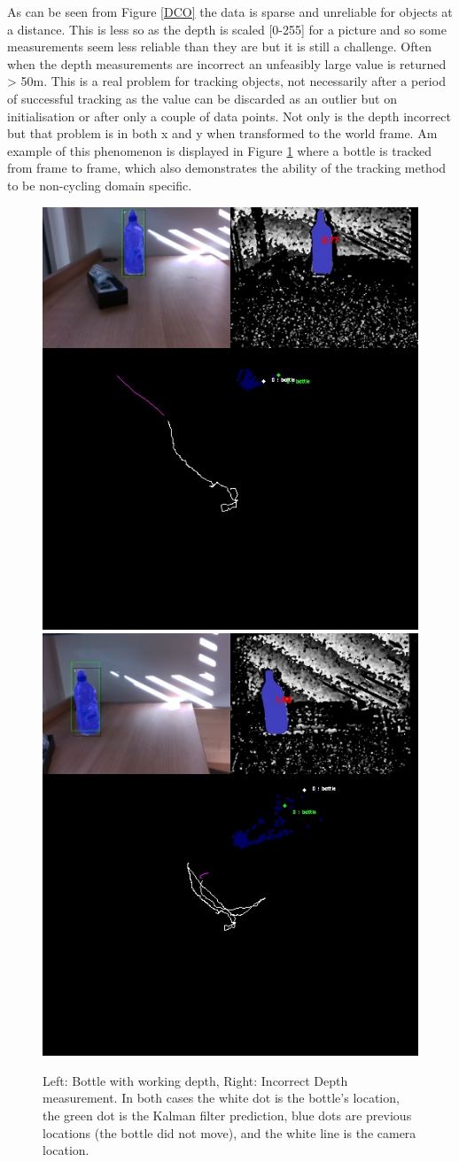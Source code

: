 \documentclass[a4paper,11pt,notitlepage]{article}
\begin{document}
As can be seen from Figure \ref{DCO} the data is sparse and unreliable for objects at a distance. This is less so as the depth is scaled [0-255] for a picture and so some measurements seem less reliable than they are but it is still a challenge. Often when the depth measurements are incorrect an unfeasibly large value is returned > 50m. This is a real problem for tracking objects, not necessarily after a period of successful tracking as the value can be discarded as an outlier but on initialisation or after only a couple of data points. Not only is the depth incorrect but that problem is in both x and y when transformed to the world frame. Am example of this phenomenon is displayed in Figure \ref{bottle} where a bottle is tracked from frame to frame, which also demonstrates the ability of the tracking method to be non-cycling domain specific.

 \noindent \begin{figure}[h!]
 	\includegraphics[width = 0.5\hsize]{figures/bottle2.jpg}
 	\includegraphics[width = 0.5\hsize]{figures/bottle1.jpg}
 	\caption{Left: Bottle with working depth, Right: Incorrect Depth measurement. In both cases the white dot is the bottle's location, the green dot is the Kalman filter prediction, blue dots are previous locations (the bottle did not move), and the white line is the camera location.}
 	\label{bottle}
 \end{figure}
\end{document}

